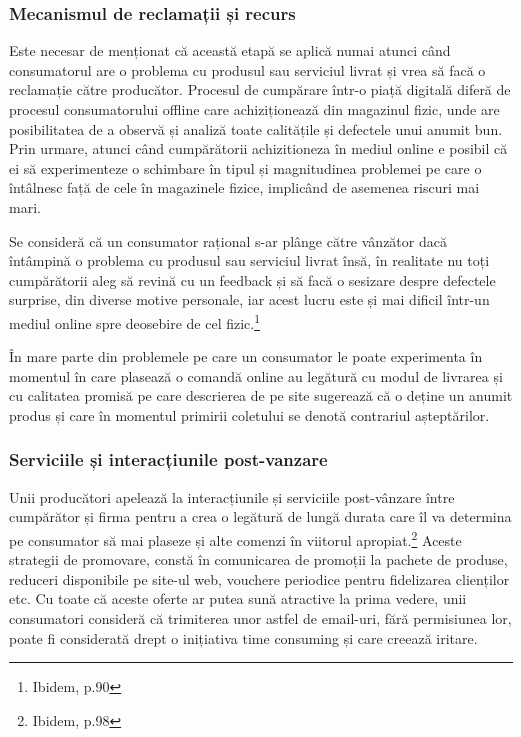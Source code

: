 \documentclass[a4paper, 12pt]{article}
\begin{document}
		\subsubsection{Mecanismul de reclamații și recurs}
		
		\quad\quad Este necesar de menționat că această etapă se aplică numai atunci când consumatorul are o problema cu produsul sau serviciul livrat și vrea să facă o reclamație către producător. Procesul de cumpărare într-o piață digitală diferă de procesul consumatorului offline care achiziționează din magazinul fizic, unde are posibilitatea de a observă și analiză toate calitățile și defectele unui anumit bun. Prin urmare, atunci când cumpărătorii achizitioneza în mediul online e posibil că ei să experimenteze o schimbare în tipul și magnitudinea problemei pe care o întâlnesc față de cele în magazinele fizice, implicând de asemenea riscuri mai mari.
		
		\quad Se consideră că un consumator rațional s-ar plânge către vânzător dacă întâmpină o problema cu produsul sau serviciul livrat însă, în realitate nu toți cumpărătorii aleg să revină cu un feedback și să facă o sesizare despre defectele surprise, din diverse motive personale, iar acest lucru este și mai dificil într-un mediul online spre deosebire de cel fizic.\footnote{Ibidem, p.90}
		
		\quad În mare parte din problemele pe care un consumator le poate experimenta în momentul în care plasează o comandă online au legătură cu  modul de livrarea și cu calitatea promisă pe care descrierea de pe site sugerează că o deține un anumit produs și care în momentul primirii coletului se denotă contrariul așteptărilor.
		
		\subsubsection{Serviciile și interacțiunile post-vanzare}
		
		\quad\quad Unii producători apelează la interacțiunile și serviciile post-vânzare între cumpărător și firma pentru a crea o legătură de lungă durata care îl va determina pe consumator să mai plaseze și alte comenzi în viitorul apropiat.\footnote{Ibidem, p.98} Aceste strategii de promovare, constă în comunicarea de promoții la pachete de produse, reduceri disponibile pe site-ul web, vouchere periodice pentru fidelizarea clienților etc. Cu toate că aceste oferte ar putea sună atractive la prima vedere, unii consumatori consideră că trimiterea unor astfel de email-uri, fără permisiunea lor, poate fi considerată drept o inițiativa time consuming și care creează iritare.
		
\end{document}
